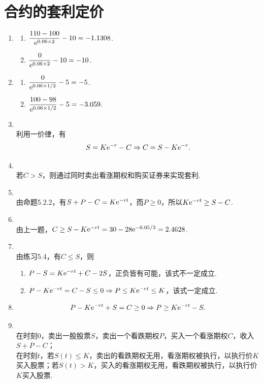 \section{合约的套利定价}
\begin{enumerate}[label=\arabic{section}.\arabic*]
    \item \sol
    \begin{enumerate}[label=\alph*)]
        \item $\displaystyle \frac{110-100}{\mathrm{e}^{0.06\times2}}-10=-1.1308$.
        \item $\displaystyle \frac{0}{\mathrm{e}^{0.06\times2}}-10=-10$.
    \end{enumerate}
    \item \sol
    \begin{enumerate}[label=\alph*)]
        \item $\displaystyle \frac{0}{\mathrm{e}^{0.06\times1/2}}-5=-5$.
        \item $\displaystyle \frac{100-98}{\mathrm{e}^{0.06\times1/2}}-5=-3.059$.
    \end{enumerate}
    \item \sol\\
    利用一价律，有\[S=K\mathrm{e}^{-r}-C \Rightarrow C=S-K\mathrm{e}^{-r}.\]
    \item \pro\\
    若$C>S$，则通过同时卖出看涨期权和购买证券来实现套利.
    \item \sol\\
    由命题5.2.2，有$S+P-C=K\mathrm{e}^{-rt}$，而$P \geq 0$，所以$K\mathrm{e}^{-rt} \geq S-C$.
    \item \sol\\
    由上一题，$C \geq S-K\mathrm{e}^{-rt}=30-28\mathrm{e}^{-0.05/3}=2.4628$.
    \item \sol\\
    由练习5.4，有$C \leq S$，则
    \begin{enumerate}[label=\alph*)]
        \item $P-S=K\mathrm{e}^{-rt}+C-2S$，正负皆有可能，该式不一定成立.
        \item $P-K\mathrm{e}^{-rt}=C-S \leq 0 \Rightarrow P \leq K\mathrm{e}^{-rt} \leq K$，该式一定成立.
    \end{enumerate}
    \item \pro \[P-K\mathrm{e}^{-rt}+S=C \geq 0 \Rightarrow P \geq K\mathrm{e}^{-rt}-S.\]
    \item \pro\\
    在时刻0，卖出一股股票$S$，卖出一个看跌期权$P$，买入一个看涨期权$C$，收入$S+P-C$；\\
    在时刻$t$，若$S(t) \leq K$，卖出的看跌期权无用，看涨期权被执行，以执行价$K$买入股票；若$S(t) > K$，买入的看涨期权无用，看跌期权被执行，以执行价$K$买入股票.\\

\end{enumerate}
